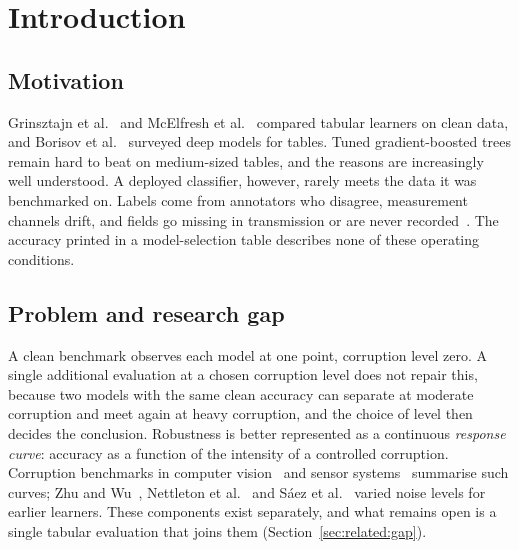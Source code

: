 \documentclass[pdflatex,sn-mathphys]{sn-jnl}
\theoremstyle{thmstyleone}
\theoremstyle{thmstyletwo}
\theoremstyle{thmstylethree}
\begin{document}

\maketitle

\section{Introduction}\label{sec:intro}

\subsection{Motivation}\label{sec:intro:motivation}

Grinsztajn et al.~\cite{grinsztajn2022tree} and McElfresh et al.~\cite{mcelfresh2023when} compared tabular learners on clean data, and Borisov et al.~\cite{borisov2024deep} surveyed deep models for tables. Tuned gradient-boosted trees remain hard to beat on medium-sized tables, and the reasons are increasingly well understood. A deployed classifier, however, rarely meets the data it was benchmarked on. Labels come from annotators who disagree, measurement channels drift, and fields go missing in transmission or are never recorded~\cite{sambasivan2021everyone}. The accuracy printed in a model-selection table describes none of these operating conditions.

\subsection{Problem and research gap}\label{sec:intro:gap}

A clean benchmark observes each model at one point, corruption level zero. A single additional evaluation at a chosen corruption level does not repair this, because two models with the same clean accuracy can separate at moderate corruption and meet again at heavy corruption, and the choice of level then decides the conclusion. Robustness is better represented as a continuous \emph{response curve}: accuracy as a function of the intensity of a controlled corruption. Corruption benchmarks in computer vision~\cite{hendrycks2019benchmarking} and sensor systems~\cite{mena2025multisensor} summarise such curves; Zhu and Wu~\cite{zhu2004class}, Nettleton et al.~\cite{nettleton2010study} and S\'aez et al.~\cite{saez2015evaluating} varied noise levels for earlier learners. These components exist separately, and what remains open is a single tabular evaluation that joins them (Section~\ref{sec:related:gap}).
\end{document}
